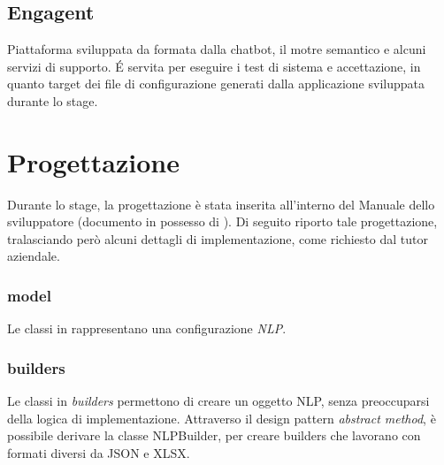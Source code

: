 \subsection*{Engagent}
Piattaforma sviluppata da {\company} formata dalla chatbot, il motre semantico e alcuni servizi di supporto. \'E servita per eseguire i test di sistema e accettazione, in quanto target dei file di configurazione generati dalla applicazione sviluppata durante lo stage. 

\section{Progettazione}
\label{sec:progettazione}
Durante lo stage, la progettazione è stata inserita all'interno del Manuale dello sviluppatore (documento in possesso di \company). Di seguito riporto tale progettazione, tralasciando però alcuni dettagli di implementazione, come richiesto dal tutor aziendale.
\subsubsection{model} %
Le classi in  rappresentano una configurazione \textit{NLP}.

\begin{namespacedesc}
\end{namespacedesc}

\subsubsection{builders} %
Le classi in \textit{builders} permettono di creare un oggetto NLP, senza preoccuparsi della logica di implementazione. Attraverso il design pattern \textit{abstract method}, è possibile derivare la classe NLPBuilder, per creare builders che lavorano con formati diversi da JSON e XLSX.


